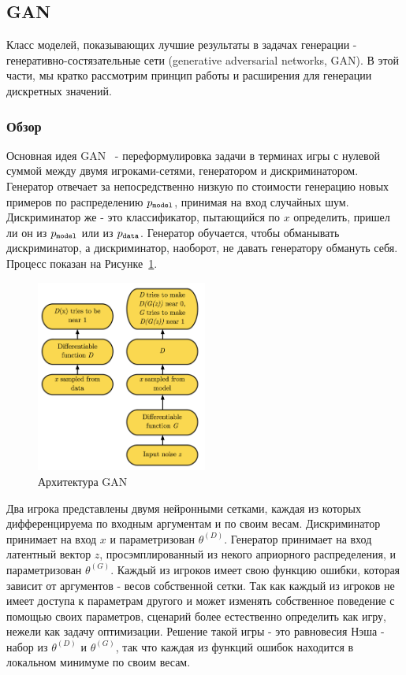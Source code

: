 \documentclass{spbau-diploma}
\begin{document}
\subsection{GAN}
Класс моделей, показывающих лучшие результаты в задачах генерации - 
генеративно-состязательные сети (generative adversarial networks, GAN). В этой 
части, мы кратко рассмотрим принцип работы и расширения для генерации дискретных 
значений.

\subsubsection{Обзор}
Основная идея GAN~\cite{1406.2661} - переформулировка задачи в терминах 
игры с нулевой суммой между двумя игроками-сетями, генератором и 
дискриминатором. Генератор отвечает за непосредственно низкую по стоимости 
генерацию новых примеров по распределению $p_{\texttt{model}}$, принимая на вход случайных 
шум. Дискриминатор же - это классификатор, пытающийся по $x$ определить,
пришел ли он из $p_{\texttt{model}}$ или из $p_{\texttt{data}}$. Генератор обучается, чтобы обманывать 
дискриминатор, а дискриминатор, наоборот, не давать генератору обмануть себя. 
Процесс показан на Рисунке~\ref{gan_fw}.

\begin{figure}[H]
\centering
\includegraphics[width=0.5\textwidth]{images/gan_fw.png}
\caption{Архитектура GAN~\cite{1701.00160}}
\label{gan_fw}
\end{figure}

Два игрока представлены двумя нейронными сетками, каждая из которых 
дифференцируема по входным аргументам и по своим весам. Дискриминатор принимает
на вход $x$ и параметризован $\theta^{(D)}$. Генератор принимает на вход 
латентный вектор $z$, просэмплированный из некого априорного
распределения, и параметризован $\theta^{(G)}$. Каждый из игроков имеет свою
функцию ошибки, которая зависит от аргументов - весов собственной сетки. Так как
каждый из игроков не имеет доступа к параметрам другого и может изменять 
собственное поведение с помощью своих параметров, сценарий более 
естественно определить как игру, нежели как задачу оптимизации. Решение такой
игры - это равновесия Нэша - набор из $\theta^{(D)}$ и $\theta^{(G)}$, так что
каждая из функций ошибок находится в локальном минимуме по своим весам.
\end{document}
